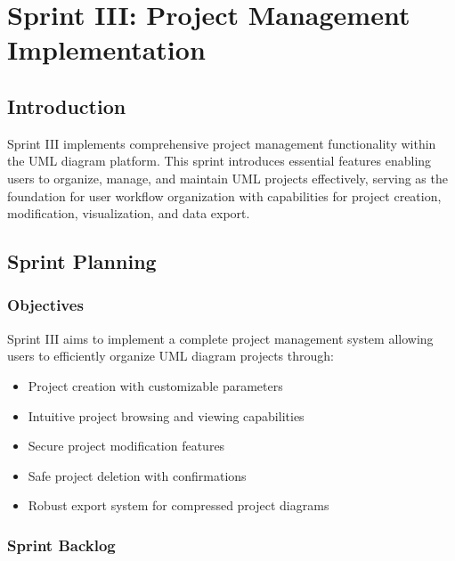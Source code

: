 \chapter[Sprint III]{Sprint III: Project Management Implementation}

\section{Introduction}

Sprint III implements comprehensive project management functionality within the UML diagram platform. This sprint introduces essential features enabling users to organize, manage, and maintain UML projects effectively, serving as the foundation for user workflow organization with capabilities for project creation, modification, visualization, and data export.

\section{Sprint Planning}

\subsection{Objectives}
Sprint III aims to implement a complete project management system allowing users to efficiently organize UML diagram projects through:
\begin{itemize}
    \item Project creation with customizable parameters
    \item Intuitive project browsing and viewing capabilities
    \item Secure project modification features
    \item Safe project deletion with confirmations
    \item Robust export system for compressed project diagrams
\end{itemize}

\subsection{Sprint Backlog}


